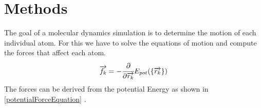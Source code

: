 \chapter{Methods}
\begin{comment}
	0. Verlet Step
	1. Describe the Lenard Jones Potential
	2. Describe the Berendsen Thermostat
	3. Describe the Gupta 
	
\end{comment}
\begin{comment}
	Atoms are discreticed into the Postitions, Velocities and Forces 
	Second propagate the atom in the discriticed realm given constant Forces
		-> Velocity-Verlet Integration
	
	Compute Forces somehow
	-> Potentials
	LJ Potential 
	Gupta Potential
	
	Thermodynamic Effects
	Berendsen Thermostat
		->Gentle Way of resealing the Velocities
		
\end{comment}
\begin{comment}
goals of a md simulation
- determine the motion of each atom
	-> solve equation of motion 
	-> compute forces
	-> From the dirivation of the potential energy we can get the forces

- disciticed in time

\end{comment}
The goal of a molecular dynamics simulation is to determine the motion of each individual atom. For this we have to solve the equations of motion and compute the forces that affect each atom.
\begin{equation}
	\label{potentialForceEquation}
	\overrightarrow{f_{k}} = -\cfrac{\displaystyle\partial}{\displaystyle \partial \overrightarrow{r_{k}}} E_{pot}(\{\overrightarrow{r_{k}}\}) 
\end{equation}
The forces can be derived from the potential Energy as shown in \ref{potentialForceEquation} \cite[cf.][]{molDymCourse}. 


